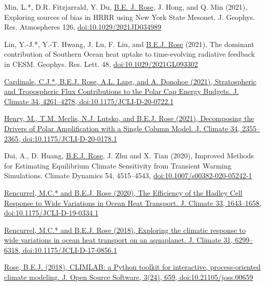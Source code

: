 \documentclass[11pt, letterpaper]{article} %
\newcommand{\years}[1]{\marginnote{\scriptsize #1}} %
\newcommand{\publink}{http://www.atmos.albany.edu/facstaff/brose/resources/Publications/}
\begin{document}
\years{2021}
Min, L.*, D.R. Fitzjarrald, Y. Du, \underline{B.E. J. Rose}, J. Hong, and Q. Min (2021), Exploring sources of bias in HRRR using New York State Mesonet. J. Geophys. Res. Atmospheres 126, \href{https://doi.org/10.1029/2021JD034989}{doi:10.1029/2021JD034989}
\vspace{0.2 cm}

Lin, Y.-J.*, Y.-T. Hwang, J. Lu, F. Liu, and \underline{B.E.J. Rose} (2021), The dominant contribution of Southern Ocean heat uptake to time-evolving radiative feedback in CESM. Geophys. Res. Lett. 48, \href{https://doi.org/10.1029/2021GL093302}{doi:10.1029/2021GL093302}
\vspace{0.2 cm}

\href{\publink Cardinale_etal_JClim2021.pdf}{Cardinale, C.J.*, \underline{B.E.J. Rose}, A.L. Lang, and A. Donohoe (2021), Stratospheric and Tropospheric Flux Contributions to the Polar Cap Energy Budgets. J. Climate 34, 4261--4278, doi:10.1175/JCLI-D-20-0722.1}
\vspace{0.2 cm}

\href{\publink Henry_etal_JClim2021.pdf}{Henry, M., T.M. Merlis, N.J. Lutsko, and \underline{B.E.J. Rose} (2021), Decomposing the Drivers of Polar Amplification with a Single Column Model. J. Climate 34, 2355--2365, doi:10.1175/JCLI-D-20-0178.1}
\vspace{0.2 cm}

\years{2020} 
Dai, A., D. Huang, \underline{B.E.J. Rose}, J. Zhu and X. Tian (2020), Improved Methods for Estimating Equilibrium Climate Sensitivity from Transient Warming Simulations. Climate Dynamics 54, 4515--4543, \href{https://doi.org/10.1007/s00382-020-05242-1}{doi:10.1007/s00382-020-05242-1}
\vspace{0.2 cm}

\href{\publink Rencurrel_Rose_JClim2020.pdf}{Rencurrel, M.C.* and \underline{B.E.J. Rose} (2020), The Efficiency of the Hadley Cell Response to Wide Variations in Ocean Heat Transport. J. Climate 33, 1643--1658, doi:10.1175/JCLI-D-19-0334.1}
\vspace{0.2 cm}

\years{2018} 
\href{\publink Rencurrel_Rose_jcli-d-17-0856.1.pdf}{Rencurrel, M.C.* and \underline{B.E.J. Rose} (2018), Exploring the climatic response to wide variations in ocean heat transport on an aquaplanet. J. Climate 31, 6299--6318, doi:10.1175/JCLI-D-17-0856.1} 
\vspace{0.2 cm}

\href{\publink Rose_JOSS2018.pdf}{\underline{Rose, B.E.J.} (2018), CLIMLAB: a Python toolkit for interactive, process-oriented climate modeling. J. Open Source Software, 3(24), 659, doi:10.21105/joss.00659}
\vspace{0.2 cm}
\end{document}
